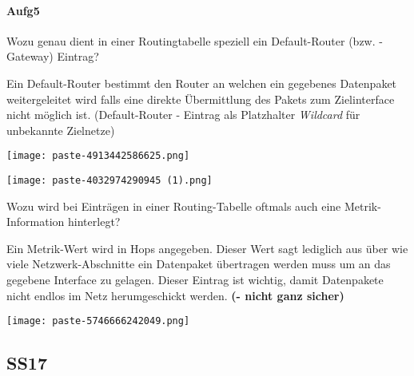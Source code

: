 \documentclass{article}
\begin{document}
\paragraph{Aufg5}
\begin{tcolorbox}[colback=white!10!white,colframe=lightgray!75!black,
  savelowerto=\jobname_ex.tex,breakable,enhanced,lines before break=40]

\justifying
Wozu genau dient in einer Routingtabelle speziell ein Default-Router (bzw. -Gateway) Eintrag?

\tcblower

\justifying
Ein Default-Router bestimmt den Router an welchen ein gegebenes Datenpaket weitergeleitet wird falls eine direkte Übermittlung des Pakets zum Zielinterface nicht möglich ist. (Default-Router - Eintrag als Platzhalter \textit{Wildcard} für unbekannte Zielnetze)\begin{center}
\texttt{[image: paste-4913442586625.png]}
\end{center}
\begin{center}
\texttt{[image: paste-4032974290945 (1).png]}
\end{center}

\end{tcolorbox}
\begin{tcolorbox}[colback=white!10!white,colframe=lightgray!75!black,
  savelowerto=\jobname_ex.tex,breakable,enhanced,lines before break=40]

\justifying
Wozu wird bei Einträgen in einer Routing-Tabelle oftmals auch eine Metrik-Information hinterlegt?

\tcblower

\justifying
Ein Metrik-Wert wird in Hops angegeben. Dieser Wert sagt lediglich aus über wie viele Netzwerk-Abschnitte ein Datenpaket übertragen werden muss um an das gegebene Interface zu gelagen. Dieser Eintrag ist wichtig, damit Datenpakete nicht endlos im Netz herumgeschickt werden. \textbf{(- nicht ganz sicher)}\begin{center}
\texttt{[image: paste-5746666242049.png]}
\end{center}

\end{tcolorbox}
\subsection{SS17}
\end{document}
